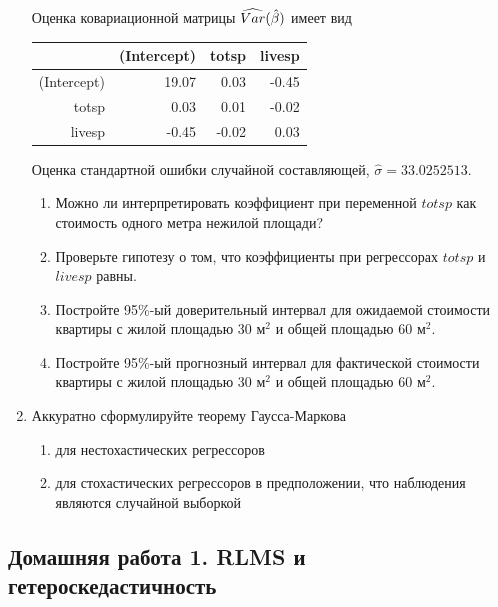 \documentclass[12pt, a4paper]{article}\usepackage[]{graphicx}\usepackage[]{color}
\begin{document}
\begin{enumerate}
Оценка ковариационной матрицы $\widehat{Var}(\hat{\beta})$ имеет вид
\begin{table}[ht]
\centering
\begin{tabular}{rrrr}
  \hline
 & (Intercept) & totsp & livesp \\ 
  \hline
(Intercept) & 19.07 & 0.03 & -0.45 \\ 
  totsp & 0.03 & 0.01 & -0.02 \\ 
  livesp & -0.45 & -0.02 & 0.03 \\ 
   \hline
\end{tabular}
\end{table}


Оценка стандартной ошибки случайной составляющей, $\hat{\sigma}=33.0252513$.

\begin{enumerate}
\item Можно ли интерпретировать коэффициент при переменной $totsp$ как стоимость одного метра нежилой площади?
\item Проверьте гипотезу о том, что коэффициенты при регрессорах $totsp$ и $livesp$ равны.
\item Постройте 95\%-ый доверительный интервал для ожидаемой стоимости квартиры с жилой площадью $30$ м$^2$ и общей площадью $60$ м$^2$.
\item Постройте 95\%-ый прогнозный интервал для фактической стоимости квартиры с жилой площадью $30$ м$^2$ и общей площадью $60$ м$^2$.
\end{enumerate}

\item Аккуратно сформулируйте теорему Гаусса-Маркова
\begin{enumerate}
\item для нестохастических регрессоров
\item для стохастических регрессоров в предположении, что наблюдения являются случайной выборкой
\end{enumerate}




\end{enumerate}



\subsection{Домашняя работа 1. RLMS и гетероскедастичность}
\end{document}
